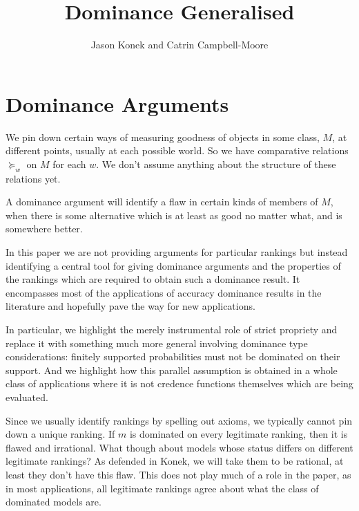 \documentclass[11pt]{article}
\title{Dominance Generalised}
\author{Jason Konek and Catrin Campbell-Moore}
\theoremstyle{definition}
\theoremstyle{remark}
\begin{document}
\maketitle

\section{Dominance Arguments}

We pin down certain ways of measuring goodness of objects in some class, $M$, at different points, usually at each possible world. So we have comparative relations $\succeq_w$ on $M$ for each $w$. We don't assume anything about the structure of these relations yet. 


A dominance argument will identify a flaw in certain kinds of members of $M$, when there is some alternative which is at least as good no matter what, and is somewhere better. 



In this paper we are not providing arguments for particular rankings but instead identifying a central tool for giving dominance arguments and the properties of the rankings which are required to obtain such a dominance result. It encompasses most of the applications of accuracy dominance results in the literature and hopefully pave the way for new applications. 

In particular, we highlight the merely instrumental role of strict propriety and replace it with something much more general involving dominance type considerations: finitely supported probabilities must not be dominated on their support. And we highlight how this parallel assumption is obtained in a whole class of applications where it is not credence functions themselves which are being evaluated. 


Since we usually identify rankings by spelling out axioms, we typically cannot pin down a unique ranking. 
If $m$ is dominated on every legitimate ranking, then it is flawed and irrational. What though about models whose status differs on different legitimate rankings? 
As defended in Konek, we will take them to be rational, at least they don't have this flaw. This does not play much of a role in the paper, as in most applications, all legitimate rankings agree about what the class of dominated models are. 
\end{document}

